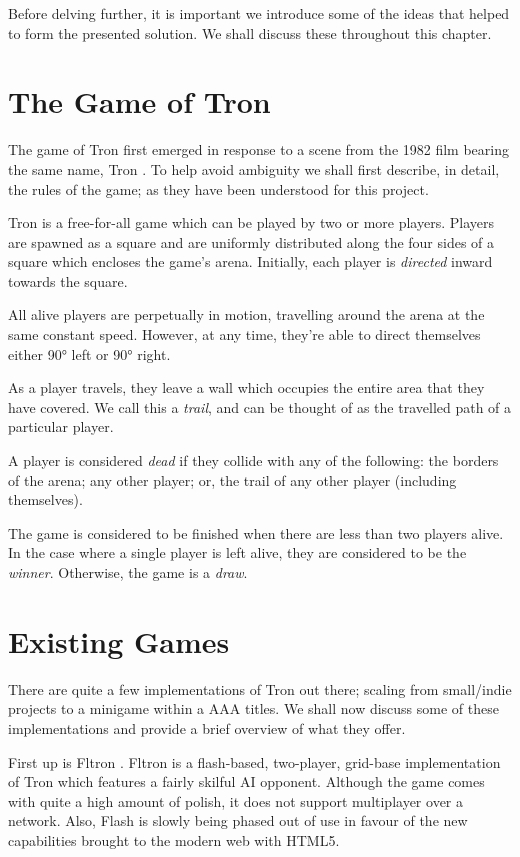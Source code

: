 \documentclass[class=article, crop=false]{standalone}
\begin{document}
	Before delving further, it is important we introduce some of the ideas that helped to form the presented solution. We shall discuss these throughout this chapter.

	\section{The Game of Tron}
		The game of Tron first emerged in response to a scene from the 1982 film bearing the same name, Tron \parencite{TronLightCycleBattle}. To help avoid ambiguity we shall first describe, in detail, the rules of the game; as they have been understood for this project.

		Tron is a free-for-all game which can be played by two or more players. Players are spawned as a square and are uniformly distributed along the four sides of a square which encloses the game's arena. Initially, each player is \emph{directed} inward towards the square.

		All alive players are perpetually in motion, travelling around the arena at the same constant speed. However, at any time, they're able to direct themselves either 90\si{\degree} left or 90\si{\degree} right.

		As a player travels, they leave a wall which occupies the entire area that they have covered. We call this a \emph{trail}, and can be thought of as the travelled path of a particular player.

		A player is considered \emph{dead} if they collide with any of the following: the borders of the arena; any other player; or, the trail of any other player (including themselves).

		The game is considered to be finished when there are less than two players alive. In the case where a single player is left alive, they are considered to be the \emph{winner}. Otherwise, the game is a \emph{draw}.

	\label{sec:existingGames}
	\section{Existing Games}
		There are quite a few implementations of Tron out there; scaling from small/indie projects to a minigame within a AAA titles. We shall now discuss some of these implementations and provide a brief overview of what they offer.

		First up is Fltron \parencite{Fltron}. Fltron is a flash-based, two-player, grid-base implementation of Tron which features a fairly skilful AI opponent. Although the game comes with quite a high amount of polish, it does not support multiplayer over a network. Also, Flash is slowly being phased out of use in favour of the new capabilities brought to the modern web with HTML5. \parencite{Html5Flash} 
\end{document}
